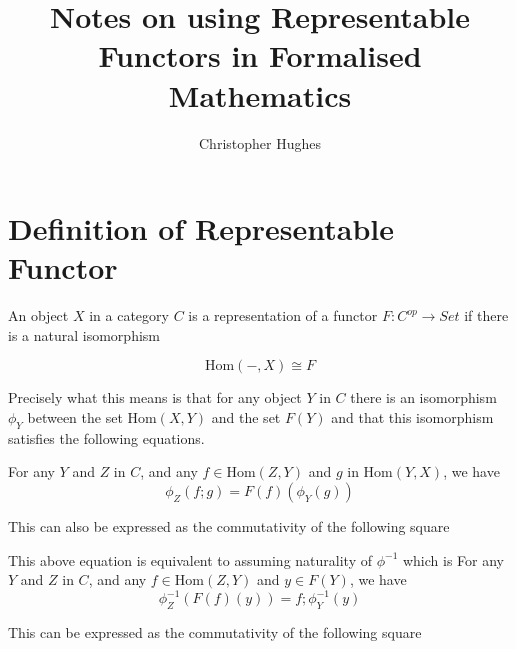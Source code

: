\documentclass[12pt]{article} %
\title{Notes on using Representable Functors in Formalised Mathematics}
\author{Christopher Hughes}
\theoremstyle{definition}
\theoremstyle{definition}
\theoremstyle{definition}
\theoremstyle{definition}
\begin{document}
\section{Definition of Representable Functor}

An object $X$ in a category $C$ is a representation of a functor $F : C^{op} \rightarrow Set$ if there is a natural isomorphism

\begin{equation}
  \text{Hom}(-, X) \cong F
\end{equation}

Precisely what this means is that for any object $Y$ in $C$ there is an isomorphism $\phi_Y$ between the set $\text{Hom}(X, Y)$ and the set $F(Y)$ and
that this isomorphism satisfies the following equations.

For any $Y$ and $Z$ in $C$, and any $f \in \text{Hom}(Z, Y)$ and $g$ in $\text{Hom}(Y, X)$, we have
\begin{equation}
  \phi_Z(f ; g) = F(f)(\phi_Y(g))
\end{equation}

This can also be expressed as the commutativity of the following square



This above equation is equivalent to assuming naturality of $\phi^{-1}$ which is
For any $Y$ and $Z$ in $C$, and any $f \in \text{Hom}(Z, Y)$ and $y \in F(Y)$, we have
\begin{equation}
  \phi_Z^{-1}(F(f)(y)) = f ; \phi_Y^{-1}(y)
\end{equation}

This can be expressed as the commutativity of the following square

\end{document}
